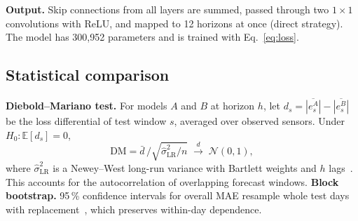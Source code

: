 \textbf{Output.} Skip connections from all layers are summed, passed through two
$1{\times}1$ convolutions with ReLU, and mapped to 12 horizons at once (direct
strategy). The model has 300,952 parameters and is trained with Eq.~\eqref{eq:loss}.

\subsection{Statistical comparison}
\textbf{Diebold--Mariano test.} For models $A$ and $B$ at horizon $h$, let
$d_s=\overline{|e^A_s|}-\overline{|e^B_s|}$ be the loss differential of test window
$s$, averaged over observed sensors. Under $H_0:\mathbb{E}[d_s]=0$,
\begin{equation}
\mathrm{DM}=\bar{d}\,\big/\sqrt{\hat{\sigma}^2_{\mathrm{LR}}/n}\;\xrightarrow{d}\;\mathcal{N}(0,1),
\end{equation}
where $\hat{\sigma}^2_{\mathrm{LR}}$ is a Newey--West long-run variance with
Bartlett weights and $h$ lags~\cite{diebold1995,newey1987}. This accounts for the
autocorrelation of overlapping forecast windows.
\textbf{Block bootstrap.} 95\,\% confidence intervals for overall MAE resample whole
test days with replacement~\cite{kunsch1989}, which preserves within-day dependence.
